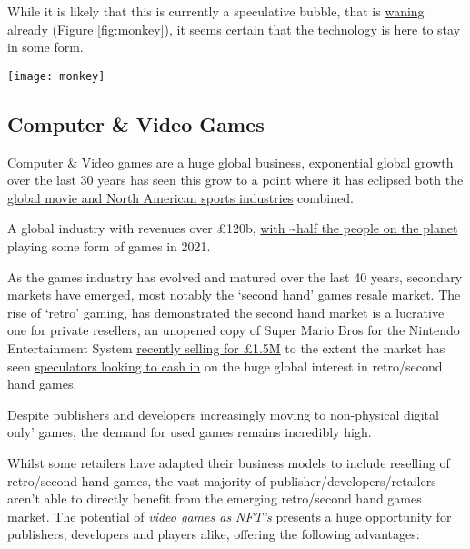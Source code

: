 
While it is likely that this is currently a speculative bubble, that is \href{https://www.bbc.co.uk/news/business-61102759}{waning already} (Figure \ref{fig:monkey}), it seems certain that the technology is here to stay in some form.\par

\begin{figure*}[ht]\centering %
	\texttt{[image: monkey]}
	\caption{The \href{https://www.coingecko.com/en/nft/bored-ape-yacht-club}{bubble bursts} on Yuga Bored Apes for now.}
	\label{fig:monkey}
\end{figure*}


\subsection{Computer \& Video Games}
Computer \& Video games are a huge global business, exponential global
growth over the last 30 years has seen this grow to a point where it has
eclipsed both the
\href{https://www.businessinsider.com/video-game-industry-revenues-exceed-sports-and-film-combined-idc-2020-12?r=US\&IR=T}{global
movie and North American sports industries} combined.

A global industry with revenues over £120b,
\href{https://www.wepc.com/news/video-game-statistics/}{with
\textasciitilde half the people on the planet} playing some form of
games in 2021.

As the games industry has evolved and matured over the last 40 years,
secondary markets have emerged, most notably the `second hand' games
resale market. The rise of `retro' gaming, has demonstrated the second
hand market is a lucrative one for private resellers, an unopened copy
of Super Mario Bros for the Nintendo Entertainment System
\href{https://www.nytimes.com/2021/08/06/business/super-mario-bros-sale-record.html}{recently
selling for £1.5M} to the extent the market has seen
\href{https://www.businessinsider.com/retro-gaming-market-being-overtaken-by-speculators-2021-9?r=US\&IR=T}{speculators
looking to cash in} on the huge global interest in retro/second hand
games.\par
Despite publishers and developers increasingly moving to non-physical
digital only' games, the demand for used games remains incredibly high.\par
Whilst some retailers have adapted their business models to include reselling of retro/second hand games, the vast majority of publisher/developers/retailers aren't able to directly benefit from the
emerging retro/second hand games market. The potential of \emph{video
games as NFT's} presents a huge opportunity for publishers, developers
and players alike, offering the following advantages:
